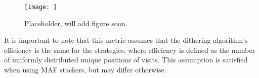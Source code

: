 \begin{figure}[htb]
    \centering
    \caption{Placeholder, will add figure soon.}
    \label{fig:WLSystematicsRankings}
\texttt{[image: ]}
\end{figure}

It is important to note that this metric assumes that the dithering algorithm's efficiency is the same for the strategies, where efficiency is defined as the number of uniformly distributed unique positions of visits. This assumption is satisfied when using MAF stackers, but may differ otherwise.
